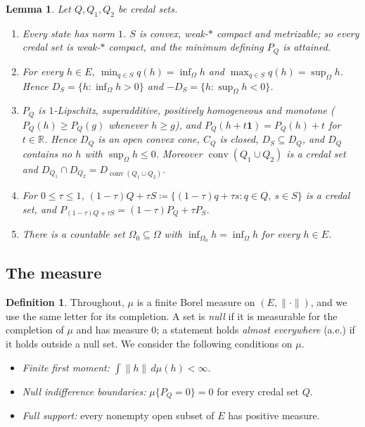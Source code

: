 \documentclass[11pt]{article}
\newcommand{\R}{\mathbb{R}}
\newcommand{\one}{\mathbf{1}}
\DeclareMathOperator{\conv}{conv}
\theoremstyle{plain}
\newtheorem{lemma}[theorem]{Lemma}
\theoremstyle{definition}
\newtheorem{definition}[theorem]{Definition}
\theoremstyle{remark}
\begin{document}
\begin{lemma}\label{lem:states}
Let $Q,Q_1,Q_2$ be credal sets.
\begin{enumerate}[label=(\alph*)]
  \item Every state has norm $1$. $S$ is convex, weak-$\ast$ compact and metrizable; so every
  credal set is weak-$\ast$ compact, and the minimum defining $P_Q$ is attained.
  \item For every $h\in E$, $\min_{q\in S}q(h)=\inf_\Omega h$ and $\max_{q\in S}q(h)=
  \sup_\Omega h$. Hence $D_S=\{h:\inf_\Omega h>0\}$ and $-D_S=\{h:\sup_\Omega h<0\}$.
  \item $P_Q$ is $1$-Lipschitz, superadditive, positively homogeneous and monotone ($P_Q(h)\ge
  P_Q(g)$ whenever $h\ge g$), and $P_Q(h+t\one)=P_Q(h)+t$ for $t\in\R$. Hence $D_Q$ is an open
  convex cone, $C_Q$ is closed, $D_S\subseteq D_Q$, and $D_Q$ contains no $h$ with
  $\sup_\Omega h\le0$. Moreover $\conv(Q_1\cup Q_2)$ is a credal set and $D_{Q_1}\cap D_{Q_2}=
  D_{\conv(Q_1\cup Q_2)}$.
  \item For $0\le\tau\le1$, $(1-\tau)Q+\tau S\coloneqq\{(1-\tau)q+\tau s:q\in Q,\ s\in S\}$ is a
  credal set, and $P_{(1-\tau)Q+\tau S}=
  (1-\tau)P_Q+\tau P_S$.
  \item There is a countable set $\Omega_0\subseteq\Omega$ with $\inf_{\Omega_0}h=\inf_\Omega h$
  for every $h\in E$.
\end{enumerate}
\end{lemma}

\subsection{The measure}

\begin{definition}\label{def:measure}
Throughout, $\mu$ is a finite Borel measure on $(E,\|\cdot\|)$, and we use the same letter for
its completion. A set is \emph{null} if it is measurable for the completion of $\mu$ and has
measure $0$; a statement holds \emph{almost everywhere} (a.e.) if it holds outside a null set.
We consider the following conditions on $\mu$.
\begin{itemize}
  \item[(M1)] \emph{Finite first moment:} $\int\|h\|\,d\mu(h)<\infty$.
  \item[(M2)] \emph{Null indifference boundaries:} $\mu\{P_Q=0\}=0$ for every credal set $Q$.
  \item[(M3)] \emph{Full support:} every nonempty open subset of $E$ has positive measure.
\end{itemize}
\end{definition}
\end{document}
